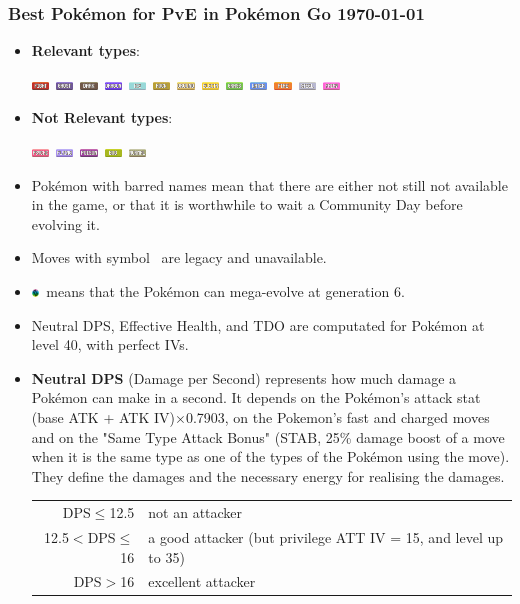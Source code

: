 \documentclass[12pt]{beamer}
\newcommand{\fightingfull}{\includegraphics[height=0.2cm]{../../images/type/full/Fighting.png}}
\newcommand{\bugfull}{\includegraphics[height=0.2cm]{../../images/type/full/Bug.png}}
\newcommand{\darkfull}{\includegraphics[height=0.2cm]{../../images/type/full/Dark.png}}
\newcommand{\electricfull}{\includegraphics[height=0.2cm]{../../images/type/full/Electric.png}}
\newcommand{\fairyfull}{\includegraphics[height=0.2cm]{../../images/type/full/Fairy.png}}
\newcommand{\firefull}{\includegraphics[height=0.2cm]{../../images/type/full/Fire.png}}
\newcommand{\flyingfull}{\includegraphics[height=0.2cm]{../../images/type/full/Flying.png}}
\newcommand{\ghostfull}{\includegraphics[height=0.2cm]{../../images/type/full/Ghost.png}}
\newcommand{\dragonfull}{\includegraphics[height=0.2cm]{../../images/type/full/Dragon.png}}
\newcommand{\grassfull}{\includegraphics[height=0.2cm]{../../images/type/full/Grass.png}}
\newcommand{\groundfull}{\includegraphics[height=0.2cm]{../../images/type/full/Ground.png}}
\newcommand{\icefull}{\includegraphics[height=0.2cm]{../../images/type/full/Ice.png}}
\newcommand{\normalfull}{\includegraphics[height=0.2cm]{../../images/type/full/Normal.png}}
\newcommand{\psychicfull}{\includegraphics[height=0.2cm]{../../images/type/full/Psychic.png}}
\newcommand{\rockfull}{\includegraphics[height=0.2cm]{../../images/type/full/Rock.png}}
\newcommand{\waterfull}{\includegraphics[height=0.2cm]{../../images/type/full/Water.png}}
\newcommand{\poisonfull}{\includegraphics[height=0.2cm]{../../images/type/full/Poison.png}}
\newcommand{\steelfull}{\includegraphics[height=0.2cm]{../../images/type/full/Steel.png}}
\newcommand{\megaevol}{\includegraphics[width=0.2cm]{../../images/megaevolve}}
\begin{document}
\begin{frame}
\frametitle{Best Pok\'emon for PvE in Pok\'emon Go \hspace{3.2cm} \today}

\begin{block}{}
\begin{scriptsize}

\begin{itemize}
  \item \textbf{Relevant types}: 
  
  \begin{center}
  \fightingfull ~\ghostfull ~\darkfull ~\dragonfull ~\icefull ~\rockfull ~\groundfull ~\electricfull ~\grassfull ~\waterfull ~\firefull ~\steelfull ~\fairyfull 
\end{center}
 \item \textbf{Not Relevant types}:
 \begin{center}
   \psychicfull ~\flyingfull ~\poisonfull ~\bugfull ~\normalfull
\end{center}
  \item Pok\'emon with barred names mean that there are either not still not available in the game, or that it is worthwhile to wait a Community Day before evolving it.
  \item Moves with symbol \dag~are legacy and unavailable.
  \item \megaevol~means that the Pok\'emon can mega-evolve at generation 6.
  \item Neutral DPS, Effective Health, and TDO are computated for Pok\'emon at level 40, with perfect IVs. 
  \item \textbf{Neutral DPS} (Damage per Second) represents how much damage a Pok\'emon can make in a second. It depends on the Pok\'emon's attack stat (base ATK + ATK IV)$\times$0.7903, on the Pokemon's fast and charged moves and on the "Same Type Attack Bonus" (STAB, 25\% damage boost of a move when it is the same type as one of the types of the Pokémon using the move). They define the damages and the necessary energy for realising the damages.
\begin{center}
\begin{tabular}{rl}
DPS$\leq$12.5   &  not an attacker  \\
12.5$<$DPS$\leq$16   &  a good attacker (but privilege ATT IV = 15, and level up to 35)  \\
DPS$>$16   &  excellent attacker  \\
\end{tabular}
\end{center}

\end{itemize}
\end{scriptsize}
\end{block}
\end{frame}
\end{document}
